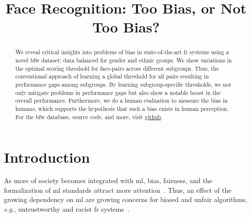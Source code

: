 \documentclass[10pt,twocolumn,letterpaper]{article}
\newcommand{\eg}{\textit{e}.\textit{g}., }
\begin{document}
\title{Face Recognition: Too Bias, or Not Too Bias?}


\maketitle

\begin{abstract}
We reveal critical insights into problems of bias in state-of-the-art \gls{fr} systems using a novel \gls{bfw} dataset: data balanced for gender and ethnic groups. We show variations in the optimal scoring threshold for face-pairs across different subgroups. Thus, the conventional approach of learning a  global threshold for all pairs resulting in performance gaps among subgroups. By learning subgroup-specific thresholds, we not only mitigate problems in performance gaps but also show a notable boost in the overall performance. Furthermore, we do a human evaluation to measure the bias in humans, which supports the hypothesis that such a bias exists in human perception. For the \gls{bfw} database, source code, and more, visit \href{http://cvpr2020.thecvf.com/submission/main-conference/author-guidelines#policies}{github}.
\end{abstract}



\glsresetall
\section{Introduction}
    As more of society becomes integrated with \gls{ml}, bias, fairness, and the formalization of \gls{ml} standards attract more attention~\cite{10.1007/978-3-030-13469-3_68, anne2018women, wang2018racial}. Thus, an effect of the growing dependency on \gls{ml} are growing concerns for biased and unfair algorithms, \eg untrustworthy and racist \gls{fr} systems~\cite{england2019,snow2018}.
    
\end{document}
